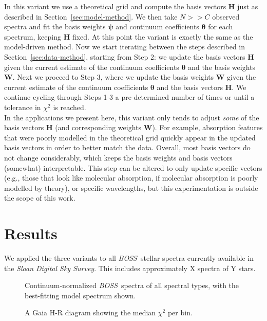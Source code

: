 \documentclass[modern]{aastex631}
\newcommand{\project}[1]{\textit{#1}}
\newcommand{\vectheta}{\boldsymbol{\theta}}
\newcommand{\vecpsi}{\boldsymbol{\psi}}
\newcommand{\vecW}{\mathbf{W}}
\newcommand{\vecH}{\mathbf{H}}
\newcommand{\boss}{\project{BOSS}}
\newcommand{\todo}[1]{\textcolor{tab:blue}{#1}}
\begin{document}
In this variant we use a theoretical grid and compute the basis vectors $\vecH$ just as described in Section~\ref{sec:model-method}. We then take $N >> C$ observed spectra and fit the basis weights $\vecpsi$ and continuum coefficients $\vectheta$ for each spectrum, keeping $\vecH$ fixed. At this point the variant is exactly the same as the model-driven method. Now we start iterating between the steps described in Section~\ref{sec:data-method}, starting from Step 2: we update the basis vectors $\vecH$ given the current estimate of the continuum coefficients $\vectheta$ and the basis weights $\vecW$. Next we proceed to Step 3, where we update the basis weights $\vecW$ given the current estimate of the continuum coefficients $\vectheta$ and the basis vectors $\vecH$. We continue cycling through Steps 1-3 a pre-determined number of times or until a tolerance in $\chi^2$ is reached.\\

In the applications we present here, this variant only tends to adjust \emph{some} of the basis vectors $\vecH$ (and corresponding weights $\vecW$). For example, absorption features that were poorly modelled in the theoretical grid quickly appear in the updated basis vectors in order to better match the data. Overall, most basis vectors do not change considerably, which keeps the basis weights and basis vectors (somewhat) interpretable. This step can be altered to only update specific vectors (e.g., those that look like molecular absorption, if molecular absorption is poorly modelled by theory), or specific wavelengths, but this experimentation is outside the scope of this work.

\section{Results}
\label{sec:results}

We applied the three variants to all \boss\ stellar spectra currently available in the \emph{Sloan Digital Sky Survey}. This includes approximately \todo{X} spectra of \todo{Y} stars. 


\begin{figure}
    \caption{Continuum-normalized \boss\ spectra of all spectral types, with the best-fitting model spectrum shown.}
\end{figure}



\begin{figure}
    \caption{A Gaia H-R diagram showing the median $\chi^2$ per bin.}
\end{figure}
\end{document}
